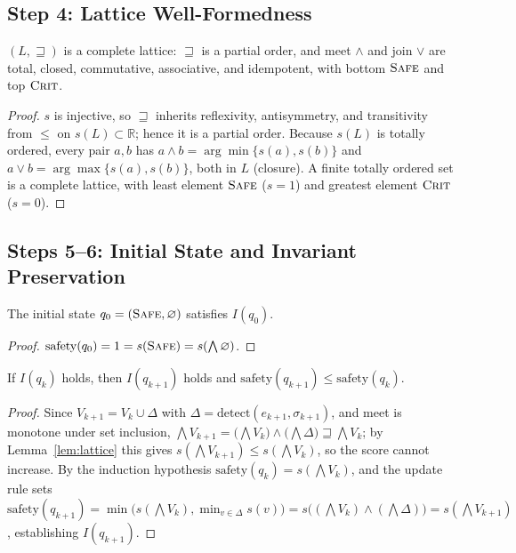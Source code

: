 \documentclass[manuscript,screen,review,anonymous]{acmart}
\begin{document}
\subsection{Step 4: Lattice Well-Formedness}

\begin{lemma}\label{lem:lattice}
$(L,\sqsupseteq)$ is a complete lattice: $\sqsupseteq$ is a partial order, and meet $\wedge$ and join $\vee$ are total, closed, commutative, associative, and idempotent, with bottom $\textsc{Safe}$ and top $\textsc{Crit}$.
\end{lemma}
\begin{proof}
$s$ is injective, so $\sqsupseteq$ inherits reflexivity, antisymmetry, and transitivity from $\le$ on $s(L)\subset\mathbb{R}$; hence it is a partial order. Because $s(L)$ is totally ordered, every pair $a,b$ has $a\wedge b=\arg\min\{s(a),s(b)\}$ and $a\vee b=\arg\max\{s(a),s(b)\}$, both in $L$ (closure). A finite totally ordered set is a complete lattice, with least element $\textsc{Safe}$ ($s=1$) and greatest element $\textsc{Crit}$ ($s=0$).
\end{proof}

\subsection{Steps 5--6: Initial State and Invariant Preservation}

\begin{lemma}\label{lem:init}
The initial state $q_0=(\textsc{Safe},\varnothing)$ satisfies $I(q_0)$.
\end{lemma}
\begin{proof}
$\mathrm{safety}(q_0)=1=s(\textsc{Safe})=s(\bigwedge\varnothing)$.
\end{proof}

\begin{theorem}\label{thm:preserve}
If $I(q_k)$ holds, then $I(q_{k+1})$ holds and $\mathrm{safety}(q_{k+1})\le \mathrm{safety}(q_k)$.
\end{theorem}
\begin{proof}
Since $V_{k+1}=V_k\cup \Delta$ with $\Delta=\mathrm{detect}(e_{k+1},\sigma_{k+1})$, and meet is monotone under set inclusion, $\bigwedge V_{k+1}=\big(\bigwedge V_k\big)\wedge\big(\bigwedge\Delta\big)\sqsupseteq \bigwedge V_k$; by Lemma~\ref{lem:lattice} this gives $s(\bigwedge V_{k+1})\le s(\bigwedge V_k)$, so the score cannot increase. By the induction hypothesis $\mathrm{safety}(q_k)=s(\bigwedge V_k)$, and the update rule sets $\mathrm{safety}(q_{k+1})=\min\!\big(s(\bigwedge V_k),\min_{v\in\Delta}s(v)\big)=s\big((\bigwedge V_k)\wedge(\bigwedge\Delta)\big)=s(\bigwedge V_{k+1})$, establishing $I(q_{k+1})$.
\end{proof}
\end{document}
